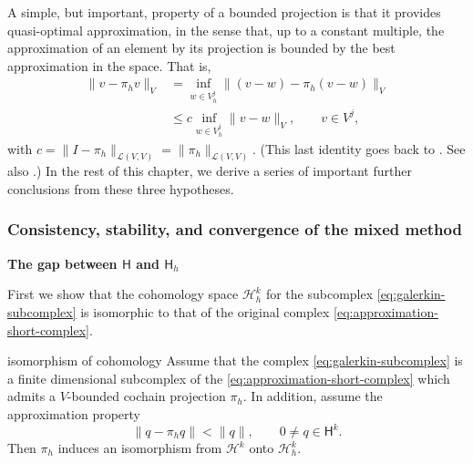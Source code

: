 {A simple, but important, property of a bounded projection is that it provides quasi-optimal approximation, in the sense that, up to a constant multiple, the approximation of an element by its projection is bounded by the best approximation in the space. That is,}
\begin{equation}\label{eq:projection-quasioptimality}
\begin{aligned}
\|v-\pi_hv\|_V&=\inf_{w\in V_h^j}\|(v-w)-\pi_h(v-w)\|_V\\
&\leq c\inf_{w\in V_h^j}\|v-w\|_V,\qquad v\in V^j,
\end{aligned}
\end{equation}
{with $c=\|I-\pi_h\|_{\mathcal L(V,V)}=\|\pi_h\|_{\mathcal L(V,V)}$. (This last identity goes back to . See also .) In the rest of this chapter, we derive a series of important further conclusions from these three hypotheses.}

\subsubsection{{Consistency, stability, and convergence of the mixed method}}\label{subsec:mixed-consistency-stability}

\medskip\noindent\textbf{{The gap between $\mathsf H$ and $\mathsf H_h$}}\par
{First we show that the cohomology space $\mathcal H_h^k$ for the subcomplex \eqref{eq:galerkin-subcomplex} is isomorphic to that of the original complex \eqref{eq:approximation-short-complex}.}

\begin{Theorem}{{isomorphism of cohomology}}\label{thm:discrete-cohomology-isomorphism}
{Assume that the complex \eqref{eq:galerkin-subcomplex} is a finite dimensional subcomplex of the \eqref{eq:approximation-short-complex} which admits a $V$-bounded cochain projection $\pi_h$. In addition, assume the approximation property}
\begin{equation}\label{eq:harmonic-projection-strict-error}
\|q-\pi_hq\|<\|q\|,\qquad0\ne q\in\mathsf H^k.
\end{equation}
{Then $\pi_h$ induces an isomorphism from $\mathcal H^k$ onto $\mathcal H_h^k$.}
\end{Theorem}

